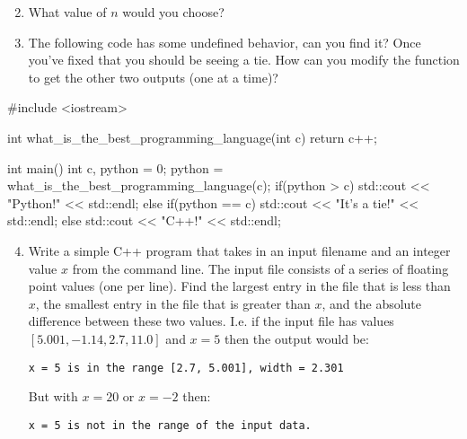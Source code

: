 \documentclass[12pt,letterpaper,twoside]{article}
\begin{document}
\begin{enumerate}
   \setcounter{enumi}{1}
\item What value of $n$ would you choose?
\end{enumerate}

\newpage

\begin{enumerate}
   \setcounter{enumi}{2}
\item The following code has some undefined behavior, can you find it?  Once you've fixed that you should be seeing a tie.  How can you modify the function to get the other two outputs (one at a time)?
\end{enumerate}
\begin{cpp}
#include <iostream>

int what_is_the_best_programming_language(int c){
  return c++;
}

int main() {
  int c, python = 0;
  python = what_is_the_best_programming_language(c);
  if(python > c){
    std::cout << "Python!" << std::endl;
  }
  else if(python == c){
    std::cout << "It's a tie!" << std::endl;
  }
  else{
    std::cout << "C++!" << std::endl;
  }
}
\end{cpp}
 \bigskip

\begin{enumerate}
   \setcounter{enumi}{3}
\item Write a simple C++ program that takes in an input filename and an integer value $x$ from the command line.  The input file consists of a series of floating point values (one per line).  Find the largest entry in the file that is less than $x$, the smallest entry in the file that is greater than $x$, and the absolute difference between these two values.  I.e. if the input file has values $[5.001, -1.14, 2.7, 11.0]$ and $x = 5$ then the output would be:

{
\footnotesize
\begin{verbatim}
x = 5 is in the range [2.7, 5.001], width = 2.301
\end{verbatim}
}
But with $x=20$ or $x = -2$ then:
{
\footnotesize
\begin{verbatim}
x = 5 is not in the range of the input data. 
\end{verbatim}
}
\end{enumerate}
\end{document}
